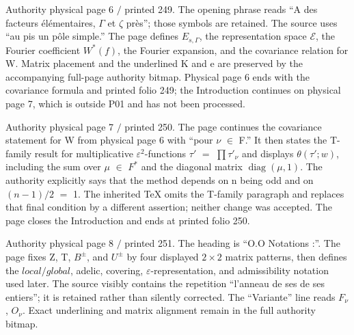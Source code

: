 \documentclass[10pt,a4paper]{article}
\begin{document}
\clearpage
{}
\label{d035-physical-006}
\par Authority physical page 6 $/$ printed 249. The opening phrase reads ``A des facteurs élémentaires, $\Gamma{}$ et $\zeta{}$ près''; those symbols are retained. The source uses ``au pis un pôle simple.'' The page defines $E_{s,\Gamma{}}$, the representation space $\mathcal{E}$, the Fourier coefficient $W^*(f)$, the Fourier expansion, and the covariance relation for W. Matrix placement and the underlined K and e are preserved by the accompanying full-page authority bitmap. Physical page 6 ends with the covariance formula and printed folio 249; the Introduction continues on physical page 7, which is outside P01 and has not been processed.\par

\clearpage
{}
\label{d035-physical-007}
\par Authority physical page 7 $/$ printed 250. The page continues the covariance statement for W from physical page 6 with ``pour $\nu{}$ $\in{}$ F.'' It then states the T-family result for multiplicative $\varepsilon{}^{2}$-functions $\tau{}'$ $=$ $\prod{}\tau{}'_\nu{}$ and displays $\theta{}(\tau{}';w)$, including the sum over $\mu{}$ $\in{}$ $F^*$ and the diagonal matrix $\operatorname{diag}(\mu{},1)$. The authority explicitly says that the method depends on n being odd and on $(n-1)/2$ $=$ 1. The inherited TeX omits the T-family paragraph and replaces that final condition by a different assertion; neither change was accepted. The page closes the Introduction and ends at printed folio 250.\par

\clearpage
{}
\label{d035-physical-008}
\par Authority physical page 8 $/$ printed 251. The heading is ``O.O Notations :''. The page fixes Z, T, $B^\pm{}$, and $U^\pm{}$ by four displayed $2\times{}2$ matrix patterns, then defines the $local/global$, adelic, covering, $\varepsilon{}$-representation, and admissibility notation used later. The source visibly contains the repetition ``l'anneau de ses de ses entiers''; it is retained rather than silently corrected. The ``Variante'' line reads $F_\nu{}$, $O_\nu{}$. Exact underlining and matrix alignment remain in the full authority bitmap.\par
\end{document}
